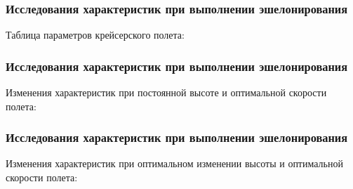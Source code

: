 \documentclass{beamer}
\begin{document}
\begin{frame}[t]
    \frametitle{Исследования характеристик при выполнении эшелонирования}
\begin{center}
    Таблица параметров крейсерского полета:
    \begin{minipage}{\textwidth}
        \begin{table}[H]
            \centering
            \resizebox{0.6\textwidth}{!}{}
        \end{table}
    \end{minipage}
\end{center}
\end{frame}

\begin{frame}[t]
    \frametitle{Исследования характеристик при выполнении эшелонирования}
    \begin{center}
        Изменения характеристик при постоянной высоте и оптимальной скорости полета:

        \begin{minipage}{0.49\textwidth}
            \centering
        \end{minipage}
        \hfill
        \begin{minipage}{0.49\textwidth}
            \centering
        \end{minipage}
    \end{center}
\end{frame}



\begin{frame}[t]
    \frametitle{Исследования характеристик при выполнении эшелонирования}
    \begin{center}
        Изменения характеристик при оптимальном изменении высоты и оптимальной
        скорости полета:

        \begin{minipage}{0.49\textwidth}
            \centering
        \end{minipage}
        \hfill
        \begin{minipage}{0.49\textwidth}
            \centering
        \end{minipage}
    \end{center}
\end{frame}
\end{document}
